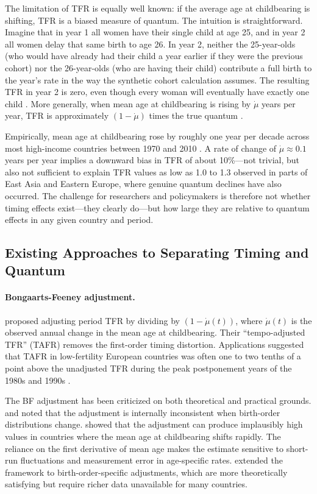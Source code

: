 \documentclass[12pt]{article}
\begin{document}
The limitation of TFR is equally well known: if the average age at
childbearing is shifting, TFR is a biased measure of quantum.  The
intuition is straightforward.  Imagine that in year 1 all women have
their single child at age 25, and in year 2 all women delay that same
birth to age 26.  In year 2, neither the 25-year-olds (who would have
already had their child a year earlier if they were the previous
cohort) nor the 26-year-olds (who are having their child) contribute a
full birth to the year's rate in the way the synthetic cohort
calculation assumes.  The resulting TFR in year 2 is zero, even though
every woman will eventually have exactly one child \citep{Ryder1964}.
More generally, when mean age at childbearing is rising by $\dot{\mu}$
years per year, TFR is approximately $(1 - \dot{\mu})$ times the true
quantum \citep{BongaartsFeeney1998}.

Empirically, mean age at childbearing rose by roughly one year per
decade across most high-income countries between 1970 and 2010
\citep{Sobotka2017}.  A rate of change of $\dot{\mu} \approx 0.1$
years per year implies a downward bias in TFR of about 10\%---not
trivial, but also not sufficient to explain TFR values as low as 1.0
to 1.3 observed in parts of East Asia and Eastern Europe, where genuine
quantum declines have also occurred.  The challenge for researchers
and policymakers is therefore not whether timing effects exist---they
clearly do---but how large they are relative to quantum effects in any
given country and period.

\subsection{Existing Approaches to Separating Timing and Quantum}

\paragraph{Bongaarts-Feeney adjustment.}
\citet{BongaartsFeeney1998} proposed adjusting period TFR by dividing
by $(1 - \dot{\mu}(t))$, where $\dot{\mu}(t)$ is the observed annual
change in the mean age at childbearing.  Their ``tempo-adjusted TFR''
(TAFR) removes the first-order timing distortion.  Applications
suggested that TAFR in low-fertility European countries was often one
to two tenths of a point above the unadjusted TFR during the peak
postponement years of the 1980s and 1990s
\citep{Sobotka2003,Lesthaeghe2004}.

The BF adjustment has been criticized on both theoretical and practical
grounds.  \citet{Kim2000} and \citet{vanImhoff2001} noted that the
adjustment is internally inconsistent when birth-order distributions
change.  \citet{Sobotka2003} showed that the adjustment can produce
implausibly high values in countries where the mean age at
childbearing shifts rapidly.  The reliance on the first derivative of
mean age makes the estimate sensitive to short-run fluctuations and
measurement error in age-specific rates.  \citet{KohlerOrtega2002}
extended the framework to birth-order-specific adjustments, which are
more theoretically satisfying but require richer data unavailable for
many countries.
\end{document}
